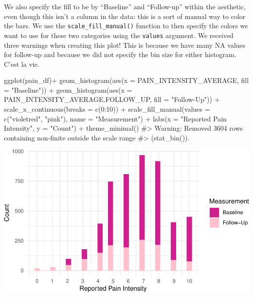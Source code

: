 \documentclass[
  letterpaper,
]{latex/krantz}
\makeatletter
\newenvironment{Shaded}{\begin{snugshade}}{\end{snugshade}}
\newcommand{\AttributeTok}[1]{\textcolor[rgb]{0.40,0.45,0.13}{#1}}
\newcommand{\CommentTok}[1]{\textcolor[rgb]{0.37,0.37,0.37}{#1}}
\newcommand{\DecValTok}[1]{\textcolor[rgb]{0.68,0.00,0.00}{#1}}
\newcommand{\FunctionTok}[1]{\textcolor[rgb]{0.28,0.35,0.67}{#1}}
\newcommand{\NormalTok}[1]{\textcolor[rgb]{0.00,0.23,0.31}{#1}}
\newcommand{\SpecialCharTok}[1]{\textcolor[rgb]{0.37,0.37,0.37}{#1}}
\newcommand{\StringTok}[1]{\textcolor[rgb]{0.13,0.47,0.30}{#1}}
\newenvironment{kframe}{%
\medskip{}
\setlength{\fboxsep}{.8em}
 \def\at@end@of@kframe{}%
 \ifinner\ifhmode%
  \def\at@end@of@kframe{\end{minipage}}%
  \begin{minipage}{\columnwidth}%
 \fi\fi%
 \def\FrameCommand##1{\hskip\@totalleftmargin \hskip-\fboxsep
 \colorbox{shadecolor}{##1}\hskip-\fboxsep
     \hskip-\linewidth \hskip-\@totalleftmargin \hskip\columnwidth}%
 \MakeFramed {\advance\hsize-\width
   \@totalleftmargin\z@ \linewidth\hsize
   \@setminipage}}%
 {\par\unskip\endMakeFramed%
 \at@end@of@kframe}
\renewenvironment{Shaded}{\begin{kframe}}{\end{kframe}}
\makeatother
\begin{document}
We also specify the fill to be by ``Baseline'' and ``Follow-up'' within
the aesthetic, even though this isn't a column in the data: this is a
sort of manual way to color the bars. We use the
\texttt{scale\_fill\_manual()}
function to then specify the colors we want to use for these two
categories using the \texttt{values} argument. We received three
warnings when creating this plot! This is because we have many NA values
for follow-up and because we did not specify the bin size for either
histogram. C'est la vie.

\begin{Shaded}
\begin{Highlighting}[]
\FunctionTok{ggplot}\NormalTok{(pain\_df)}\SpecialCharTok{+}
  \FunctionTok{geom\_histogram}\NormalTok{(}\FunctionTok{aes}\NormalTok{(}\AttributeTok{x =}\NormalTok{ PAIN\_INTENSITY\_AVERAGE, }\AttributeTok{fill =} \StringTok{"Baseline"}\NormalTok{)) }\SpecialCharTok{+}
  \FunctionTok{geom\_histogram}\NormalTok{(}\FunctionTok{aes}\NormalTok{(}\AttributeTok{x =}\NormalTok{ PAIN\_INTENSITY\_AVERAGE.FOLLOW\_UP, }
                     \AttributeTok{fill =} \StringTok{"Follow{-}Up"}\NormalTok{)) }\SpecialCharTok{+}
  \FunctionTok{scale\_x\_continuous}\NormalTok{(}\AttributeTok{breaks =} \FunctionTok{c}\NormalTok{(}\DecValTok{0}\SpecialCharTok{:}\DecValTok{10}\NormalTok{)) }\SpecialCharTok{+} 
  \FunctionTok{scale\_fill\_manual}\NormalTok{(}\AttributeTok{values =} \FunctionTok{c}\NormalTok{(}\StringTok{"violetred"}\NormalTok{, }\StringTok{"pink"}\NormalTok{), }
                    \AttributeTok{name =} \StringTok{"Measurement"}\NormalTok{) }\SpecialCharTok{+}
  \FunctionTok{labs}\NormalTok{(}\AttributeTok{x =} \StringTok{"Reported Pain Intensity"}\NormalTok{, }\AttributeTok{y =} \StringTok{"Count"}\NormalTok{) }\SpecialCharTok{+}
  \FunctionTok{theme\_minimal}\NormalTok{()}
\CommentTok{\#\textgreater{} Warning: Removed 3604 rows containing non{-}finite outside the scale range}
\CommentTok{\#\textgreater{} (\textasciigrave{}stat\_bin()\textasciigrave{}).}
\end{Highlighting}
\end{Shaded}

\begin{center}
\includegraphics[width=1\textwidth,height=\textheight]{book/visualization_ggplot_files/figure-pdf/unnamed-chunk-15-1.pdf}
\end{center}
\end{document}
